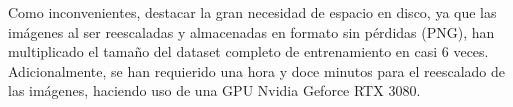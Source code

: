 Como inconvenientes, destacar la gran necesidad de espacio en disco, ya que las imágenes al ser reescaladas y almacenadas en formato sin pérdidas (PNG), han multiplicado el tamaño del dataset completo de entrenamiento en casi 6 veces. Adicionalmente, se han requierido una hora y doce minutos para el reescalado de las imágenes, haciendo uso de una GPU Nvidia Geforce RTX 3080. 